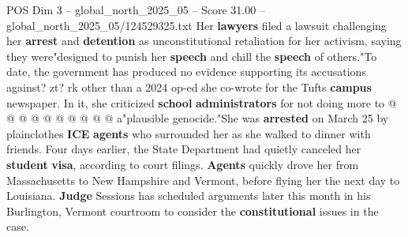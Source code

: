 \begin{textsample}{POS Dim 3 – global\_north\_2025\_05 – Score 31.00 – global\_north\_2025\_05/124529325.txt}
Her \textbf{lawyers} filed a lawsuit challenging her \textbf{arrest} and \textbf{detention} as unconstitutional retaliation for her activism, saying they were"designed to punish her \textbf{speech} and chill the \textbf{speech} of others."To date, the government has produced no evidence supporting its accusations against? zt? rk other than a 2024 op-ed she co-wrote for the Tufts \textbf{campus} newspaper.
In it, she criticized \textbf{school} \textbf{administrators} for not doing more to @ @ @ @ @ @ @ @ @ @ a"plausible genocide."She was \textbf{arrested} on March 25 by plainclothes \textbf{ICE} \textbf{agents} who surrounded her as she walked to dinner with friends.
Four days earlier, the State Department had quietly canceled her \textbf{student} \textbf{visa}, according to court filings. \textbf{Agents} quickly drove her from Massachusetts to New Hampshire and Vermont, before flying her the next day to Louisiana. \textbf{Judge} Sessions has scheduled arguments later this month in his Burlington, Vermont courtroom to consider the \textbf{constitutional} issues in the case.

\end{textsample}
